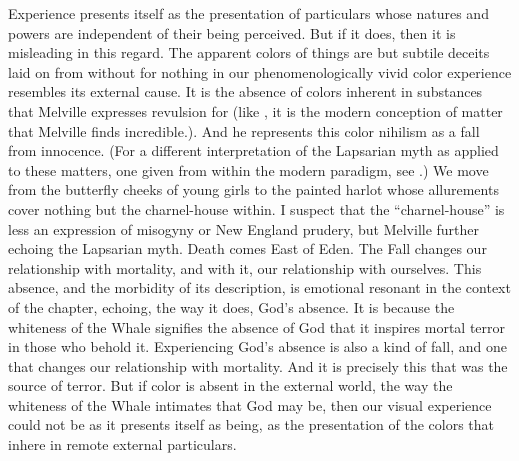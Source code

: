 Experience presents itself as the presentation of particulars whose natures and powers are independent of their being perceived. But if it does, then it is misleading in this regard. The apparent colors of things are but subtile deceits laid on from without for nothing in our phenomenologically vivid color experience resembles its external cause. It is the absence of colors inherent in substances that Melville expresses revulsion for (like \citealt[chapter one]{Bergson:1912pi}, it is the modern conception of matter that Melville finds incredible.). And he represents this color nihilism as a fall from innocence. (For a different interpretation of the Lapsarian myth as applied to these matters, one given from within the modern paradigm, see \citealt{Chalmers:2006kx}.) We move from the butterfly cheeks of young girls to the painted harlot whose allurements cover nothing but the charnel-house within. I suspect that the ``charnel-house'' is less an expression of misogyny or New England prudery, but Melville further echoing the Lapsarian myth. Death comes East of Eden. The Fall changes our relationship with mortality, and with it, our relationship with ourselves. This absence, and the morbidity of its description, is emotional resonant in the context of the chapter, echoing, the way it does, God's absence. It is because the whiteness of the Whale signifies the absence of God that it inspires mortal terror in those who behold it. Experiencing God's absence is also a kind of fall, and one that changes our relationship with mortality. And it is precisely this that was the source of terror. But if color is absent in the external world, the way the whiteness of the Whale intimates that God may be, then our visual experience could not be as it presents itself as being, as the presentation of the colors that inhere in remote external particulars.


